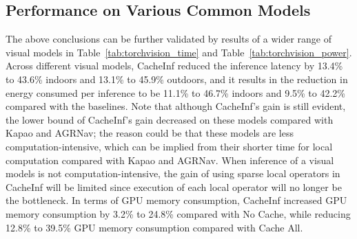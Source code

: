 \subsection{Performance on Various Common Models}
The above conclusions can be further validated by results of a wider range of visual models in Table~\ref{tab:torchvision_time} and Table~\ref{tab:torchvision_power}.
Across different visual models, CacheInf reduced the inference latency by 13.4\% to 43.6\% indoors and 13.1\% to 45.9\% outdoors, and it results in the reduction in energy consumed per inference to be 11.1\% to 46.7\% indoors and 9.5\% to 42.2\%
compared with the baselines.
Note that although CacheInf's gain is still evident, the lower bound of CacheInf's gain decreased on these models compared with Kapao and AGRNav; the reason could be that these models are less computation-intensive, which can be implied from their shorter time for local computation compared with Kapao and AGRNav.
When inference of a visual models is not computation-intensive, the gain of using sparse local operators in CacheInf will be limited since execution of each local operator will no longer be the bottleneck.
In terms of GPU memory consumption, CacheInf increased GPU memory consumption by 3.2\% to 24.8\% compared with No Cache, while reducing 12.8\% to 39.5\% GPU memory consumption compared with Cache All.

